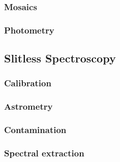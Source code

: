 \documentclass[twocolumn]{aastex63}
\begin{document}
\subsubsection{Mosaics}
\label{s:mosaics}

\subsubsection{Photometry}
\label{s:photometry}

\subsection{Slitless Spectroscopy}
\label{s:process_slitless}

\subsubsection{Calibration}
\label{s:slitless_calibration}

\subsubsection{Astrometry}
\label{s:slitless_astrometry}

\subsubsection{Contamination}
\label{s:contamination}

\subsubsection{Spectral extraction}
\label{s:extraction}

\end{document}
